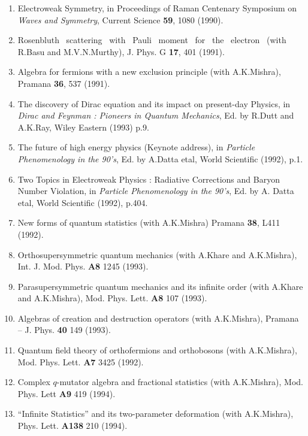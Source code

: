 \begin{enumerate}
\item Electroweak Symmetry, in Proceedings of Raman Centenary
Symposium on {\it Waves and Symmetry}, Current Science {\bf 59}, 1080
(1990).

\item Rosenbluth \ scattering \ with \ Pauli \ moment \ for \ the \
electron
\ (with R.Basu and M.V.N.Murthy), J. Phys. G {\bf 17}, 401 (1991).

\item Algebra for fermions with a new exclusion principle (with
A.K.Mishra), Pramana {\bf 36}, 537 (1991).

\item The discovery of Dirac equation and its impact on
present-day Physics, in {\it Dirac and Feynman : Pioneers in Quantum
Mechanics}, Ed. by R.Dutt and A.K.Ray, Wiley Eastern (1993) p.9.

\item The future of high energy physics  (Keynote address), in
{\it Particle Phenomenology in the 90's}, Ed. by
A.Datta etal, World Scientific (1992), p.1.

\item Two Topics in Electroweak Physics : Radiative Corrections
and Baryon Number Violation, in {\it Particle Phenomenology in the
90's}, Ed. by A. Datta etal, World Scientific (1992), p.404.

\item New forms of quantum statistics (with A.K.Mishra) Pramana
{\bf 38}, L411 (1992).

\item Orthosupersymmetric quantum mechanics (with A.Khare and
A.K.Mishra), Int. J. Mod. Phys. {\bf A8} 1245 (1993).

\item Parasupersymmetric quantum mechanics and its infinite order
(with A.Khare and A.K.Mishra), Mod. Phys. Lett. {\bf A8} 107 (1993). 

\item Algebras of creation and destruction operators (with
A.K.Mishra), Pramana -- J. Phys. {\bf 40} 149 (1993).

\item Quantum field theory of orthofermions and orthobosons (with
A.K.Mishra), Mod. Phys. Lett. {\bf A7} 3425 (1992).

\item Complex $q$-mutator algebra and fractional statistics
(with A.K.Mishra), Mod. Phys. Lett {\bf A9} 419 (1994).

\item ``Infinite Statistics'' and its two-parameter deformation
(with A.K.Mishra), Phys. Lett. {\bf A138} 210 (1994).


\end{enumerate}
